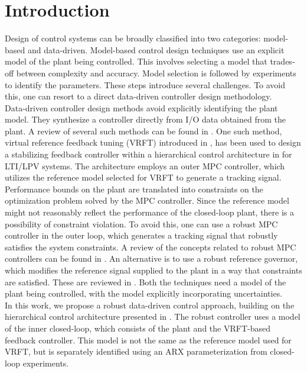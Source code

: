 \documentclass[letterpaper, 10 pt, conference]{ieeeconf}  %
\begin{document}
\section{Introduction}
Design of control systems can be broadly classified into two categories: model-based and data-driven. Model-based control design techniques use an explicit model of the plant being controlled. This involves selecting a model that trades-off between complexity and accuracy. Model selection is followed by experiments to identify the parameters. These steps introduce several challenges. To avoid this, one can resort to a direct data-driven controller design methodology. \\
\indent
Data-driven controller design methods avoid explicitly identifying the plant model. They synthesize a controller directly from I/O data obtained from the plant. A review of several such methods can be found in \cite{HOU20133}. One such method, virtual reference feedback tuning (VRFT) introduced in \cite{CAMPI20021337}, has been used to design a stabilizing feedback controller within a hierarchical control architecture in \cite{7932940} for LTI/LPV systems. The architecture employs an outer MPC controller, which utilizes the reference model selected for VRFT to generate a tracking signal. Performance bounds on the plant are translated into constraints on the optimization problem solved by the MPC controller. Since the reference model might not reasonably reflect the performance of the closed-loop plant, there is a possibility of constraint violation.
To avoid this, one can use a robust MPC controller in the outer loop, which generates a tracking signal that robustly satisfies the system constraints. A review of the concepts related to robust MPC controllers can be found in \cite{10.1007/BFb0109870}. An alternative is to use a robust reference governor, which modifies the reference signal supplied to the plant in a way that constraints are satisfied. These are reviewed in \cite{GARONE2017306}. Both the techniques need a model of the plant being controlled, with the model explicitly incorporating uncertainties.
\\ \indent
In this work, we propose a robust data-driven control approach, building on the hierarchical control architecture presented in \cite{7932940}. The robust controller uses a model of the inner closed-loop, which consists of the plant and the VRFT-based feedback controller. This model is not the same as the reference model used for VRFT, but is separately identified using an ARX parameterization from closed-loop experiments. 
\end{document}

